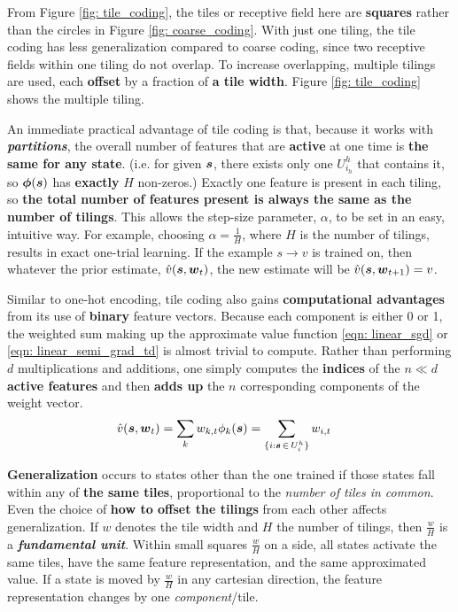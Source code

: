 \documentclass[11pt]{article}
\begin{document}
\begin{itemize}
From Figure \ref{fig: tile_coding}, the tiles or receptive field here are \textbf{squares} rather than the circles in Figure \ref{fig: coarse_coding}. With just one tiling, the tile coding has less generalization compared to coarse coding, since two receptive fields within one tiling do not overlap. To increase overlapping, multiple tilings are used, each \textbf{offset} by a fraction of \textbf{a tile width}. Figure \ref{fig: tile_coding} shows the multiple tiling. 

An immediate practical advantage of tile coding is that, because it works with \emph{\textbf{partitions}}, the overall number of features that are \textbf{active} at one time is \textbf{the same for any state}. (i.e. for given $\boldsymbol{s}$, there exists only one $U^{h}_{i_{h}}$ that contains it, so $\boldsymbol{\phi}(\boldsymbol{s})$ has \textbf{exactly} $H$ non-zeros.) Exactly one feature is present in each tiling, so \textbf{the total number of features present is always the same as the number of tilings}. This allows the step-size parameter, $\alpha$, to be set in an easy, intuitive way.  For example, choosing $\alpha = \frac{1}{H}$, where $H$ is the number of tilings, results in exact one-trial learning. If the example $s \rightarrow v$ is trained on, then whatever the prior estimate, $\hat{v}(\boldsymbol{s}, \boldsymbol{w}_{t})$, the new estimate will be $\hat{v}(\boldsymbol{s}, \boldsymbol{w}_{t+1}) = v$. 

Similar to one-hot encoding, tile coding also gains \textbf{computational advantages} from its use of \textbf{binary} feature vectors. Because each component is either 0 or 1, the weighted sum making up the approximate value function \eqref{eqn: linear_sgd} or \eqref{eqn: linear_semi_grad_td} is almost trivial to compute. Rather than performing $d$ multiplications and additions, one simply computes the \textbf{indices} of the $n \ll d$ \textbf{active features} and then \textbf{adds up} the $n$ corresponding components of the weight vector.
\begin{align*}
\hat{v}(\boldsymbol{s}, \boldsymbol{w}_{t}) &= \sum_{k}w_{k,t} \phi_{k}(\boldsymbol{s}) = \sum_{\{i: \boldsymbol{s}\, \in\, U^{h}_{i}\}} w_{i, t}
\end{align*}

\textbf{Generalization} occurs to states other than the one trained if those states fall within any of \textbf{the same tiles}, proportional to the \emph{number of tiles in common}. Even the choice of \textbf{how to offset the tilings} from each other affects generalization. If $w$ denotes the tile width and $H$ the number of tilings, then $\frac{w}{H}$ is a \emph{\textbf{fundamental unit}}. Within small squares  $\frac{w}{H}$ on a side, all states activate the same tiles, have the same feature representation, and the same approximated value. If a state is moved by $\frac{w}{H}$ in any cartesian direction, the feature representation changes by one \emph{component}/tile.


\end{itemize}
\end{document}
